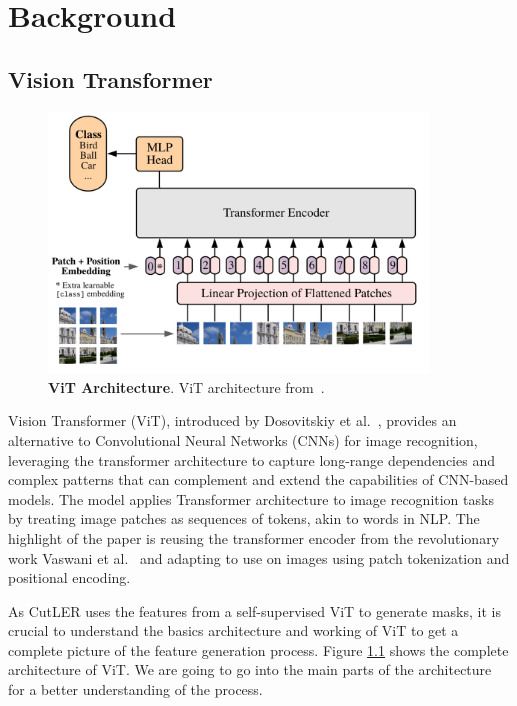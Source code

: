 \chapter{Background}\label{chap:background}

\section{Vision Transformer}

\begin{figure}
	\centering
	\includegraphics[width=0.9\textwidth]{Images/main/vit_full_arch.png}
	\caption[\textbf{ViT Architecture}]{\textbf{ViT Architecture}. ViT architecture from~\cite{dosovitskiy2020image}.}
	\label{fig:vit_full_arch}
\end{figure}

Vision Transformer (ViT), introduced by Dosovitskiy et al.~\cite{dosovitskiy2020image}, provides an alternative to Convolutional Neural Networks (CNNs) for image recognition, leveraging the transformer architecture to capture long-range dependencies and complex patterns that can complement and extend the capabilities of CNN-based models. The model applies Transformer architecture to image recognition tasks by treating image patches as sequences of tokens, akin to words in NLP. The highlight of the paper is reusing the transformer encoder from the revolutionary work Vaswani et al.~\cite{vaswani2023attentionneed} and adapting to use on images using patch tokenization and positional encoding.

As CutLER uses the features from a self-supervised ViT to generate masks, it is crucial to understand the basics architecture and working of ViT to get a complete picture of the feature generation process. Figure \ref{fig:vit_full_arch} shows the complete architecture of ViT. We are going to go into the main parts of the architecture for a better understanding of the process.

